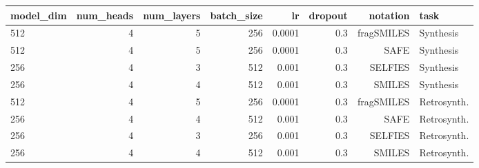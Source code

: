 \begin{tabular}{l|rrrrrrl}
\toprule
model_dim & num_heads & num_layers & batch_size & lr & dropout & notation & task \\
\midrule
512 & 4 & 5 & 256 & 0.0001 & 0.3 & fragSMILES & Synthesis \\
512 & 4 & 5 & 256 & 0.0001 & 0.3 & SAFE & Synthesis \\
256 & 4 & 3 & 512 & 0.001 & 0.3 & SELFIES & Synthesis \\
256 & 4 & 4 & 512 & 0.001 & 0.3 & SMILES & Synthesis \\
\midrule
512 & 4 & 5 & 256 & 0.0001 & 0.3 & fragSMILES & Retrosynth. \\
256 & 4 & 4 & 512 & 0.001 & 0.3 & SAFE & Retrosynth. \\
256 & 4 & 3 & 256 & 0.001 & 0.3 & SELFIES & Retrosynth. \\
256 & 4 & 4 & 512 & 0.001 & 0.3 & SMILES & Retrosynth. \\
\bottomrule
\end{tabular}
